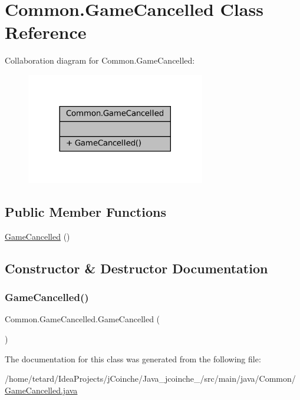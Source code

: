 \hypertarget{classCommon_1_1GameCancelled}{}\section{Common.\+Game\+Cancelled Class Reference}
\label{classCommon_1_1GameCancelled}


Collaboration diagram for Common.\+Game\+Cancelled\+:
\nopagebreak
\begin{figure}[H]
\begin{center}
\leavevmode
\includegraphics[width=221pt]{classCommon_1_1GameCancelled__coll__graph}
\end{center}
\end{figure}
\subsection*{Public Member Functions}
\begin{DoxyCompactItemize}
\item 
\mbox{\hyperlink{classCommon_1_1GameCancelled_a893afa4f7dbd2469db0042c1043ab3b9}{Game\+Cancelled}} ()
\end{DoxyCompactItemize}


\subsection{Constructor \& Destructor Documentation}
\mbox{\label{classCommon_1_1GameCancelled_a893afa4f7dbd2469db0042c1043ab3b9}} 
\subsubsection{\texorpdfstring{Game\+Cancelled()}{GameCancelled()}}
{\footnotesize\ttfamily Common.\+Game\+Cancelled.\+Game\+Cancelled (\begin{DoxyParamCaption}{ }\end{DoxyParamCaption})\hspace{0.3cm}{\ttfamily [inline]}}



The documentation for this class was generated from the following file\+:\begin{DoxyCompactItemize}
\item 
/home/tetard/\+Idea\+Projects/j\+Coinche/\+Java\+\_\+jcoinche\+\_/src/main/java/\+Common/\mbox{\hyperlink{GameCancelled_8java}{Game\+Cancelled.\+java}}\end{DoxyCompactItemize}
